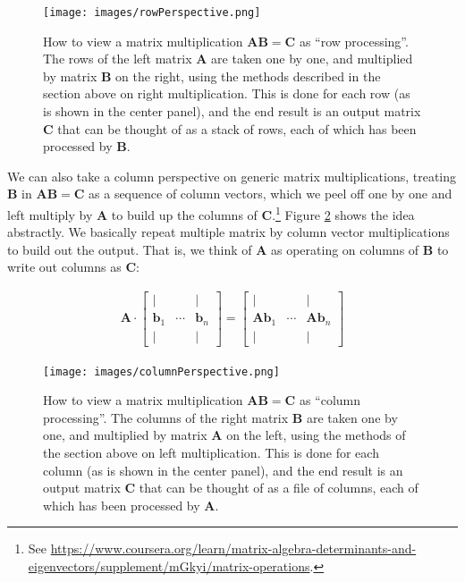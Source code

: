 \begin{figure}[h]
\centering
\texttt{[image: images/rowPerspective.png]}
\caption[Jeff Yoshimi.]{How to view a matrix multiplication  $\mathbf{A}\mathbf{B} = \mathbf{C}$ as ``row processing''. The rows of the left matrix $\mathbf{A}$ are taken one by one, and multiplied by matrix $\mathbf{B}$  on the right, using the methods described in the section above on right multiplication. This is done for each row (as is shown in the center panel), and the end result is an output matrix $\mathbf{C}$ that can be thought of as a stack of rows, each of which has been processed by $\mathbf{B}$.}
\label{rowPerspective}
\end{figure} 

We can also take a column perspective on generic matrix multiplications, treating $\mathbf{B}$ in $\mathbf{A}\mathbf{B} = \mathbf{C}$ as a sequence of column vectors, which we peel off one by one and left multiply by $\mathbf{A}$ to build up the columns of $\mathbf{C}$.\footnote{See \url{https://www.coursera.org/learn/matrix-algebra-determinants-and-eigenvectors/supplement/mGkyi/matrix-operations}.}  Figure \ref{columnPerspective} shows the idea abstractly. We basically repeat multiple matrix by column vector multiplications to build out the output. That is, we think of $\mathbf{A}$ as operating on columns of $\mathbf{B}$ to write out columns as $\mathbf{C}$:

\begin{align*}
\mathbf{A} \cdot
\begin{bmatrix}
\vert &        & \vert \\
\mathbf{b}_1 & \cdots & \mathbf{b}_n \\
\vert &        & \vert
\end{bmatrix}
=
\begin{bmatrix}
\vert &        & \vert \\
\mathbf{A} \mathbf{b}_1 & \cdots & \mathbf{A} \mathbf{b}_n \\
\vert &        & \vert
\end{bmatrix}
\end{align*}

\begin{figure}[h]
\centering
\texttt{[image: images/columnPerspective.png]}
\caption[Jeff Yoshimi.]{How to view a matrix multiplication  $\mathbf{A}\mathbf{B} = \mathbf{C}$ as ``column processing''. The columns of the right matrix $\mathbf{B}$ are taken one by one, and multiplied by matrix $\mathbf{A}$  on the left, using the methods of the section above on left multiplication. This is done for each column (as is shown in the center panel), and the end result is an output matrix $\mathbf{C}$ that can be thought of as a file of columns, each of which has been processed by $\mathbf{A}$.}
\label{columnPerspective}
\end{figure} 


